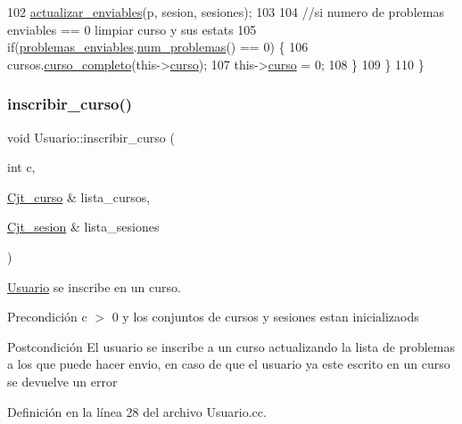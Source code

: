 \begin{DoxyCode}
102       \mbox{\hyperlink{class_usuario_a4dbe4aafe7c5308293ef5f6094f35bb1}{actualizar\_enviables}}(p, sesion, sesiones);
103 
104     \textcolor{comment}{//si numero de problemas enviables == 0 limpiar curso y sus estats}
105       \textcolor{keywordflow}{if}(\mbox{\hyperlink{class_usuario_a553cef1aad192b30d010cd524f261c1b}{problemas\_enviables}}.\mbox{\hyperlink{class_cjt__problema_acf0fca6955f991a9debb4ef50ece8905}{num\_problemas}}() == 0) \{
106         cursos.\mbox{\hyperlink{class_cjt__curso_a7e15ba1bdb4d1de93862a8c56dde53e5}{curso\_completo}}(this->\mbox{\hyperlink{class_usuario_aa767fe2d1198f2c97791073bc55803e7}{curso}});
107         this->\mbox{\hyperlink{class_usuario_aa767fe2d1198f2c97791073bc55803e7}{curso}} = 0;
108       \}
109   \}
110 \}
\end{DoxyCode}
\mbox{\label{class_usuario_ae2ebc16b4ed5e80451ca8ae12f0c8209}} 
\subsubsection{\texorpdfstring{inscribir\+\_\+curso()}{inscribir\_curso()}}
{\footnotesize\ttfamily void Usuario\+::inscribir\+\_\+curso (\begin{DoxyParamCaption}\item[{int}]{c,  }\item[{\mbox{\hyperlink{class_cjt__curso}{Cjt\+\_\+curso}} \&}]{lista\+\_\+cursos,  }\item[{\mbox{\hyperlink{class_cjt__sesion}{Cjt\+\_\+sesion}} \&}]{lista\+\_\+sesiones }\end{DoxyParamCaption})}



\mbox{\hyperlink{class_usuario}{Usuario}} se inscribe en un curso. 

\begin{DoxyPrecond}{Precondición}
c $>$ 0 y los conjuntos de cursos y sesiones estan inicializaods 
\end{DoxyPrecond}
\begin{DoxyPostcond}{Postcondición}
El usuario se inscribe a un curso actualizando la lista de problemas a los que puede hacer envio, en caso de que el usuario ya este escrito en un curso se devuelve un error 
\end{DoxyPostcond}


Definición en la línea 28 del archivo Usuario.\+cc.


